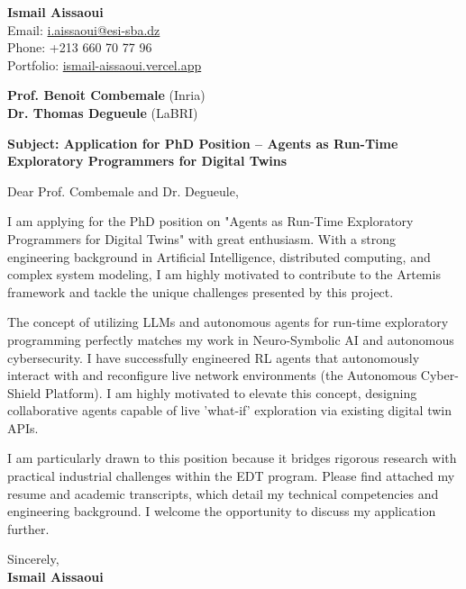 \documentclass[11pt,a4paper]{article}
\begin{document}
\thispagestyle{empty}

\begin{flushright}
\textbf{Ismail Aissaoui} \\
Email: \href{mailto:i.aissaoui@esi-sba.dz}{i.aissaoui@esi-sba.dz} \\
Phone: +213 660 70 77 96 \\
Portfolio: \href{https://ismail-aissaoui.vercel.app}{ismail-aissaoui.vercel.app}
\end{flushright}

\vspace{1em}

\begin{flushleft}
\textbf{Prof. Benoit Combemale} (Inria) \\
\textbf{Dr. Thomas Degueule} (LaBRI)
\end{flushleft}

\vspace{1em}
\noindent\textbf{Subject: Application for PhD Position -- Agents as Run-Time Exploratory Programmers for Digital Twins}
\vspace{1em}

\noindent Dear Prof. Combemale and Dr. Degueule,

\vspace{1em}
\noindent
I am applying for the PhD position on "Agents as Run-Time Exploratory Programmers for Digital Twins" with great enthusiasm. With a strong engineering background in Artificial Intelligence, distributed computing, and complex system modeling, I am highly motivated to contribute to the Artemis framework and tackle the unique challenges presented by this project.

\vspace{0.5em}
\noindent
The concept of utilizing LLMs and autonomous agents for run-time exploratory programming perfectly matches my work in Neuro-Symbolic AI and autonomous cybersecurity. I have successfully engineered RL agents that autonomously interact with and reconfigure live network environments (the Autonomous Cyber-Shield Platform). I am highly motivated to elevate this concept, designing collaborative agents capable of live 'what-if' exploration via existing digital twin APIs.

\vspace{0.5em}
\noindent
I am particularly drawn to this position because it bridges rigorous research with practical industrial challenges within the EDT program. Please find attached my resume and academic transcripts, which detail my technical competencies and engineering background. I welcome the opportunity to discuss my application further.

\vspace{1.5em}
\noindent
Sincerely, \\[0.5em]
\textbf{Ismail Aissaoui}
\end{document}
